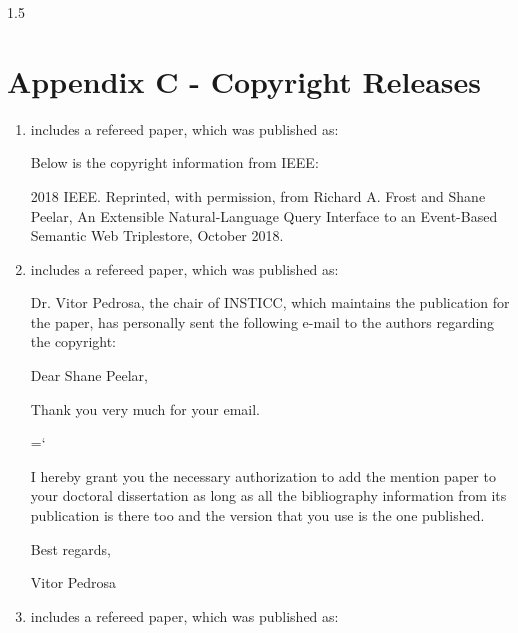 \documentclass[fleqn, oneside, 12pt]{book}
\theoremstyle{definitionsty}
\newcommand{\uwinonehalfspacelen}{1.5}
\newcommand{\uwindefaultspacelen}{\uwinonehalfspacelen}
\newenvironment{uwindefaultspaceenv}%
{\begin{spacing}{\uwindefaultspacelen}}%
	{\end{spacing}}
\begin{document}
\begin{uwindefaultspaceenv}


\section*{Appendix C - Copyright Releases}


\begin{enumerate}
	\item { includes a refereed paper, which was published as:


	Below is the copyright information from IEEE:

	2018 IEEE. Reprinted, with permission, from Richard A. Frost and Shane Peelar, An Extensible Natural-Language Query Interface to an Event-Based Semantic Web Triplestore, October 2018.}

	\item { includes a refereed paper, which was published as:


	Dr. Vitor Pedrosa, the chair of INSTICC, which maintains the publication for the paper, has personally sent the following e-mail to the authors regarding the copyright:


		{ \ttfamily
		Dear Shane Peelar,


		Thank you very much for your email.


		\hyphenchar\font=`\-%

		I hereby grant you the necessary authorization to add the mention
		paper to your doctoral dissertation as long as all the bibliography
		information from its publication is there too and the version
		that you use is the one published.


		Best regards,


		Vitor Pedrosa
		}

	}

	\item { includes a refereed paper, which was published as:

}
\end{enumerate}
\end{uwindefaultspaceenv}
\end{document}
